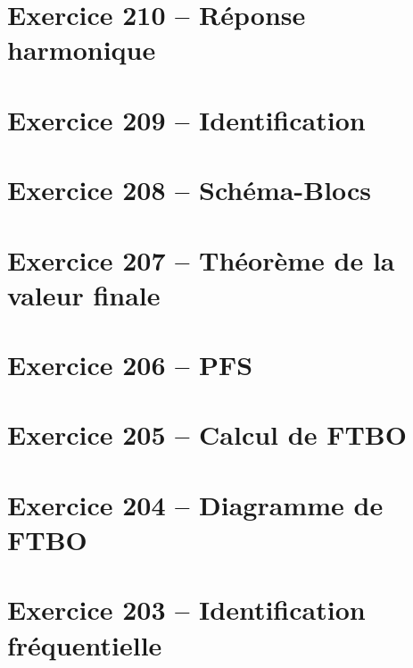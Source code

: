 \documentclass[10pt,fleqn]{article} %
\begin{document}
\begin{multicols}{2}
\section*{Exercice 210 -- Réponse harmonique}
\renewcommand{\repex}{017_Harmonique}
\graphicspath{{\repex/images/}}


\section*{Exercice 209 -- Identification}
\renewcommand{\repex}{004_IdentificationTemporelle}
\graphicspath{{\repex/images/}}


\section*{Exercice 208 -- Schéma-Blocs}
\renewcommand{\repex}{005_SchemaBlocs2E}
\graphicspath{{\repex/images/}}


\section*{Exercice 207 -- Théorème de la valeur finale}
\renewcommand{\repex}{006_ValeurFinale2E}
\graphicspath{{\repex/images/}}


\section*{Exercice 206 -- PFS}
\renewcommand{\repex}{015_PFS}
\graphicspath{{\repex/images/}}


\section*{Exercice 205 -- Calcul de FTBO}
\renewcommand{\repex}{007_FTBO}
\graphicspath{{\repex/images/}}


\section*{Exercice 204 -- Diagramme de FTBO}
\renewcommand{\repex}{008_Bode}
\graphicspath{{\repex/images/}}


\section*{Exercice 203 -- Identification fréquentielle}
\renewcommand{\repex}{009_IdentificationBode}
\graphicspath{{\repex/images/}}



\end{multicols}
\end{document}
